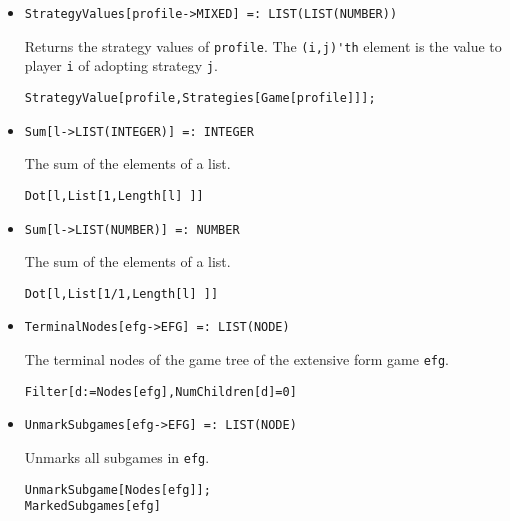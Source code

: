 \begin{itemize}
\item{}
\protect \large \begin{verbatim}
StrategyValues[profile->MIXED] =: LIST(LIST(NUMBER)) 
\end{verbatim}\normalsize

\bd 
Returns the strategy values of \verb+profile+.  The
\verb+(i,j)'th+ element is the value to player \verb+i+ of adopting
strategy \verb+j+. 
\begin{verbatim}
StrategyValue[profile,Strategies[Game[profile]]];
\end{verbatim} 
\ed

\item{}
\protect \large \begin{verbatim}
Sum[l->LIST(INTEGER)] =: INTEGER 
\end{verbatim}\normalsize

\bd 
The sum of the elements of a list.  
\begin{verbatim}
Dot[l,List[1,Length[l] ]]
\end{verbatim} 
\ed

\item{}
\protect \large \begin{verbatim}
Sum[l->LIST(NUMBER)] =: NUMBER 
\end{verbatim}\normalsize

\bd 
The sum of the elements of a list.  
\begin{verbatim}
Dot[l,List[1/1,Length[l] ]]
\end{verbatim} 
\ed



\item{}
\protect \large \begin{verbatim}
TerminalNodes[efg->EFG] =: LIST(NODE) 
\end{verbatim}\normalsize

\bd 
The terminal nodes of the game tree of the extensive form game \verb+efg+.
\begin{verbatim}
Filter[d:=Nodes[efg],NumChildren[d]=0]
\end{verbatim} 
\ed


\item{}
\protect \large \begin{verbatim}
UnmarkSubgames[efg->EFG] =: LIST(NODE)
\end{verbatim}\normalsize

\bd 
Unmarks all subgames in \verb+efg+.
\begin{verbatim}
UnmarkSubgame[Nodes[efg]];
MarkedSubgames[efg]
\end{verbatim} 
\ed






\end{itemize}

